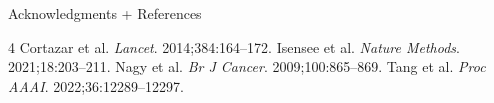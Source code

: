 \documentclass[final]{beamer}
\newlength{\sepwidth}
\newlength{\colwidth}
\newcommand{\separatorcolumn}{\begin{column}{\sepwidth}\end{column}}
\begin{document}
\begin{frame}[t]
\begin{columns}[t]
\begin{column}{\colwidth}
\begin{block}{Acknowledgments + References}
    \vspace{-2ex}
    \setlength{\bibsep}{0pt}
    \renewcommand{\bibfont}{\large}
    \begin{thebibliography}{4}
      \setlength{\parskip}{0pt}
      \setlength{\itemsep}{0pt}
      \setlength{\topsep}{0pt}
      \setlength{\parsep}{0pt}
       Cortazar et al. \emph{Lancet}. 2014;384:164--172.
       Isensee et al. \emph{Nature Methods}. 2021;18:203--211.
       Nagy et al. \emph{Br J Cancer}. 2009;100:865--869.
       Tang et al. \emph{Proc AAAI}. 2022;36:12289--12297.
    \end{thebibliography}
  \end{block}

\end{column}

\separatorcolumn
\end{columns}
\end{frame}
\end{document}
